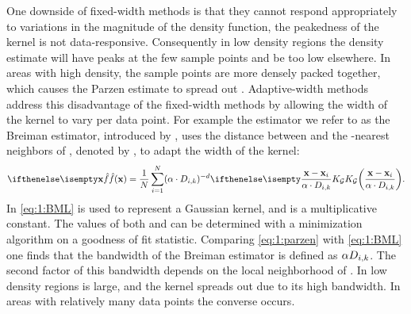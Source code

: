 	One downside of fixed-width methods is that they cannot respond appropriately to variations in the magnitude of the density function, \ie the peakedness of the kernel is not data-responsive. Consequently in low density regions the density estimate will have peaks at the few sample points and be too low elsewhere. In areas with high density, the sample points are more densely packed together, which causes the Parzen estimate to spread out \cite{breiman1977variable}. Adaptive-width methods address this disadvantage of the fixed-width methods by allowing the width of the kernel to vary per data point. For example the estimator we refer to as the Breiman estimator, introduced by \citeauthor{breiman1977variable}, uses the distance between \varPattern[\itXis] and the \KNNK-nearest neighbors of \varPattern[\itXis], denoted by \varKNNDistance{\itXis}{\KNNK}, to adapt the width of the kernel:
	\begin{equation}\label{eq:1:BML}
	 	\varEstimatedDensityFunction{\varPattern} = \frac{1}{\varNumPatterns} \sum_{\itXis = 1}^{\varNumPatterns} (\varBMLconstant \cdot \varKNNDistance{\itXis}{k})^{-\varDim} \varKernel[\varGaussian]{\frac{\varPattern - \varPattern[\itXis]}{\varBMLconstant \cdot \varKNNDistance{\itXis}{k}}}.
	\end{equation} 
	In \cref{eq:1:BML} \varKernel[\varGaussian]{} is used to represent a Gaussian kernel, and \varBMLconstant is a multiplicative constant. The values of both \varBMLconstant and \KNNK can be determined with a minimization algorithm on a goodness of fit statistic. Comparing \cref{eq:1:parzen} with \eqref{eq:1:BML} one finds that the bandwidth \varBandwidth of the Breiman estimator is defined as $\alpha D_{i, k}$. The second factor of this bandwidth depends on the local neighborhood of \varPattern[\itXis]. In low density regions \varKNNDistance{\itXis}{\KNNK} is large, and the kernel spreads out due to its high bandwidth. In areas with relatively many data points the converse occurs.


